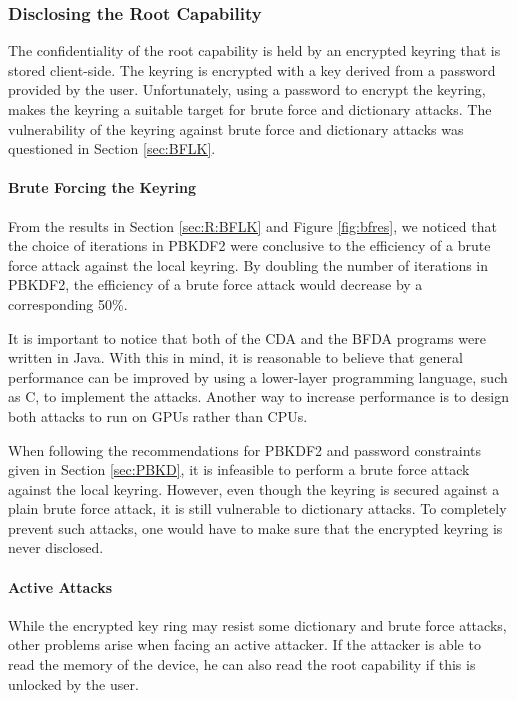 \documentclass[pdftex,english,10pt,b5paper,twoside]{book}
\begin{document}
\subsubsection{Disclosing the Root Capability}

The confidentiality of the root capability is held by an encrypted keyring that
is stored client-side. The keyring is encrypted with a key derived from a
password provided by the user. Unfortunately, using a password to encrypt the
keyring, makes the keyring a suitable target for brute force and dictionary
attacks. The vulnerability of the keyring against brute force and dictionary
attacks was questioned in Section \ref{sec:BFLK}.

\paragraph{Brute Forcing the Keyring} From the results in Section
\ref{sec:R:BFLK} and Figure \ref{fig:bfres}, we noticed that the choice of
iterations in \ac{PBKDF2} were conclusive to the efficiency of a brute force
attack against the local keyring. By doubling the number of iterations in
\ac{PBKDF2}, the efficiency of a brute force attack would decrease by a
corresponding 50\%.



It is important to notice that both of the \ac{CDA} and the \ac{BFDA} programs
were written in Java. With this in mind, it is reasonable to believe that
general performance can be improved by using a lower-layer programming
language, such as C, to implement the attacks. Another way to increase
performance is to design both attacks to run on \acp{GPU} rather than
\acp{CPU}.

When following the recommendations for \ac{PBKDF2} and password constraints
given in Section \ref{sec:PBKD}, it is infeasible to perform a brute force
attack against the local keyring. However, even though the keyring is secured
against a plain brute force attack, it is still vulnerable to dictionary
attacks. To completely prevent such attacks, one would have to make sure that
the encrypted keyring is never disclosed.

\paragraph{Active Attacks}

While the encrypted key ring may resist some dictionary and brute force
attacks, other problems arise when facing an active attacker. If the attacker
is able to read the memory of the device, he can also read the root capability
if this is unlocked by the user. 
\end{document}
